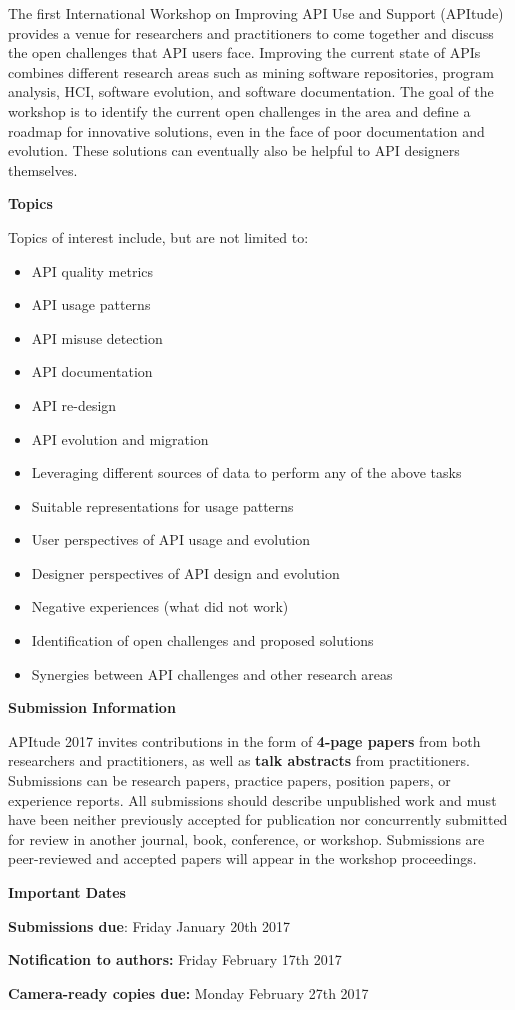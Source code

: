 \documentclass[10pt, conference]{IEEEtran}
\begin{document}
The first International Workshop on Improving API Use and Support (APItude) provides a venue for researchers and practitioners to come together and discuss the open challenges that API users face. Improving the current state of APIs combines different research areas such as mining software repositories, program analysis, HCI, software evolution, and software documentation. The goal of the workshop is to identify the current open challenges in the area and define a roadmap for innovative solutions, even in the face of poor documentation and evolution. These solutions can eventually also be helpful to API designers themselves.


\vspace{0.2cm}

\noindent
\textbf{\large Topics}
\vspace{0.2cm}

Topics of interest include, but are not limited to:
\begin{itemize}
\item API quality metrics
\item API usage patterns
\item API misuse detection
\item API documentation
\item API re-design
\item API evolution and migration
\item Leveraging different sources of data to perform any of the above tasks
\item Suitable representations for usage patterns
\item User perspectives of API usage and evolution
\item Designer perspectives of API design and evolution
\item Negative experiences (what did not work)
\item Identification of open challenges and proposed solutions
\item Synergies between API challenges and other research areas  
\end{itemize}


\vspace{0.2cm}
\noindent
\textbf{\large Submission Information}
\vspace{0.2cm}

APItude 2017 invites contributions in the form of \textbf{4-page papers} from both researchers and practitioners, as well as \textbf{talk abstracts} from practitioners. Submissions can be research papers, practice papers, position papers, or experience reports. All submissions should describe unpublished work and must have been neither previously accepted for publication nor concurrently submitted for review in another journal, book, conference, or workshop. Submissions are peer-reviewed and accepted papers will appear in the workshop proceedings.

\vspace{0.2cm}
\noindent
\textbf{\large Important Dates}
\vspace{0.2cm}

\textbf{Submissions due}: Friday January 20th 2017

\textbf{Notification to authors:} Friday February 17th 2017

\textbf{Camera-ready copies due:} Monday February 27th 2017
\end{document}
